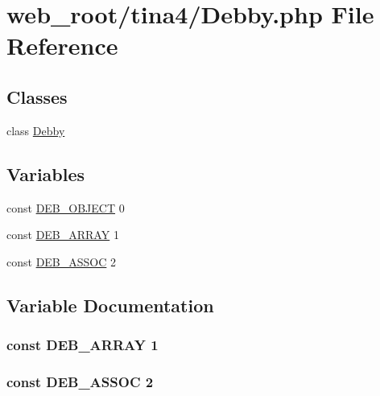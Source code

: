 \hypertarget{Debby_8php}{}\section{web\+\_\+root/tina4/\+Debby.php File Reference}
\label{Debby_8php}
\subsection*{Classes}
\begin{DoxyCompactItemize}
\item 
class \hyperlink{classDebby}{Debby}
\end{DoxyCompactItemize}
\subsection*{Variables}
\begin{DoxyCompactItemize}
\item 
const \hyperlink{Debby_8php_acaf4f00f16a383f146403a31dccd06c1}{D\+E\+B\+\_\+\+O\+B\+J\+E\+C\+T} 0
\item 
const \hyperlink{Debby_8php_ad75806d2ab1c7e4353a0a52f61793a84}{D\+E\+B\+\_\+\+A\+R\+R\+A\+Y} 1
\item 
const \hyperlink{Debby_8php_a0ef261713595fd84175fa98e45a60d8c}{D\+E\+B\+\_\+\+A\+S\+S\+O\+C} 2
\end{DoxyCompactItemize}


\subsection{Variable Documentation}
\hypertarget{Debby_8php_ad75806d2ab1c7e4353a0a52f61793a84}{}
\subsubsection[{D\+E\+B\+\_\+\+A\+R\+R\+A\+Y}]{\setlength{\rightskip}{0pt plus 5cm}const D\+E\+B\+\_\+\+A\+R\+R\+A\+Y 1}\label{Debby_8php_ad75806d2ab1c7e4353a0a52f61793a84}
\hypertarget{Debby_8php_a0ef261713595fd84175fa98e45a60d8c}{}
\subsubsection[{D\+E\+B\+\_\+\+A\+S\+S\+O\+C}]{\setlength{\rightskip}{0pt plus 5cm}const D\+E\+B\+\_\+\+A\+S\+S\+O\+C 2}\label{Debby_8php_a0ef261713595fd84175fa98e45a60d8c}
\hypertarget{Debby_8php_acaf4f00f16a383f146403a31dccd06c1}{}
